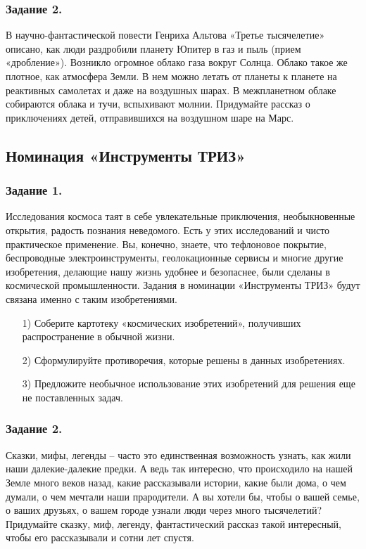 \documentclass[11pt,a4paper]{article}
\begin{document}
\subsubsection*{Задание 2.}
В научно-фантастической повести Генриха Альтова «Третье тысячелетие» описано,
как люди раздробили планету Юпитер в газ и пыль (прием «дробление»). Возникло
огромное облако газа вокруг Солнца. Облако такое же плотное, как атмосфера
Земли. В нем можно летать от планеты к планете на реактивных самолетах и даже
на воздушных шарах. В межпланетном облаке собираются облака и тучи, вспыхивают
молнии. Придумайте рассказ о приключениях детей, отправившихся на воздушном
шаре на Марс.

\subsection{Номинация «Инструменты ТРИЗ»}

\subsubsection*{Задание 1.}
Исследования космоса таят в себе увлекательные приключения, необыкновенные
открытия, радость познания неведомого. Есть у этих исследований и чисто
практическое применение. Вы, конечно, знаете, что тефлоновое покрытие,
беспроводные электроинструменты, геолокационные сервисы и многие другие
изобретения, делающие нашу жизнь удобнее и безопаснее, были сделаны в
космической промышленности. Задания в номинации «Инструменты ТРИЗ» будут
связана именно с таким изобретениями.
\begin{itemize}[noitemsep]
\item[1)] Соберите картотеку «космических изобретений», получивших
  распространение в обычной жизни.
\item[2)] Сформулируйте противоречия, которые решены в данных изобретениях.
\item[3)] Предложите необычное использование этих изобретений для решения еще
  не поставленных задач.
\end{itemize}

\subsubsection*{Задание 2.}

Сказки, мифы, легенды – часто это единственная возможность узнать, как жили
наши далекие-далекие предки. А ведь так интересно, что происходило на нашей
Земле много веков назад, какие рассказывали истории, какие были дома, о чем
думали, о чем мечтали наши прародители. А вы хотели бы, чтобы о вашей семье, о
ваших друзьях, о вашем городе узнали люди через много тысячелетий?  Придумайте
сказку, миф, легенду, фантастический рассказ такой интересный, чтобы его
рассказывали и сотни лет спустя.
\end{document}
